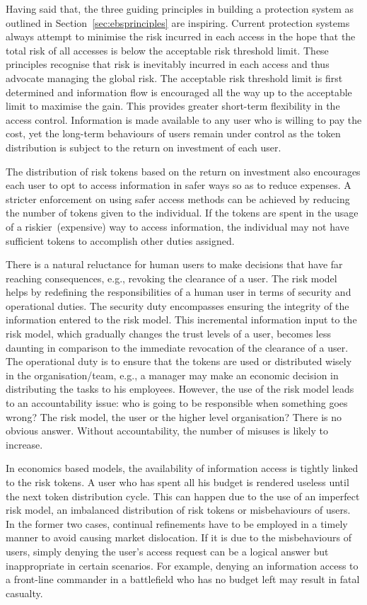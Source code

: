 Having said that, the three guiding principles in building a
protection system as outlined in Section~\ref{sec:ebsprinciples} are
inspiring. Current protection systems always attempt to minimise the
risk incurred in each access in the hope that the total risk of all
accesses is below the acceptable risk threshold limit. These
principles recognise that risk is inevitably incurred in each access
and thus advocate managing the global risk. The acceptable risk
threshold limit is first determined and information flow is encouraged
all the way up to the acceptable limit to maximise the gain. This
provides greater short-term flexibility in the access
control. Information is made available to any user who is willing to
pay the cost, yet the long-term behaviours of users remain under
control as the token distribution is subject to the return on
investment of each user.

The distribution of risk tokens based on the return on investment also
encourages each user to opt to access information in safer ways so as
to reduce expenses. A stricter enforcement on using safer access
methods can be achieved by reducing the number of tokens given to the
individual. If the tokens are spent in the usage of a
riskier~(expensive) way to access information, the individual may not
have sufficient tokens to accomplish other duties assigned.

There is a natural reluctance for human users to make decisions that
have far reaching consequences, e.g., revoking the clearance of a
user. The risk model helps by redefining the responsibilities of a
human user in terms of security and operational duties. The security
duty encompasses ensuring the integrity of the information entered to
the risk model. This incremental information input to the risk model,
which gradually changes the trust levels of a user, becomes less
daunting in comparison to the immediate revocation of the clearance of
a user. The operational duty is to ensure that the tokens are used or
distributed wisely in the organisation/team, e.g., a manager may make
an economic decision in distributing the tasks to his employees.
However, the use of the risk model leads to an accountability issue:
who is going to be responsible when something goes wrong? The risk
model, the user or the higher level organisation?  There is no obvious
answer. Without accountability, the number of misuses is likely to
increase.

In economics based models, the availability of information access is
tightly linked to the risk tokens. A user who has spent all his budget
is rendered useless until the next token distribution cycle. This can
happen due to the use of an imperfect risk model, an imbalanced
distribution of risk tokens or misbehaviours of users. In the former
two cases, continual refinements have to be employed in a timely
manner to avoid causing market dislocation. If it is due to the
misbehaviours of users, simply denying the user's access request can
be a logical answer but inappropriate in certain scenarios. For
example, denying an information access to a front-line commander in a
battlefield who has no budget left may result in fatal casualty.

